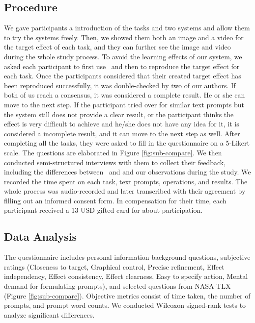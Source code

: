 \subsection{Procedure} 
We gave participants a  introduction of the tasks and two systems and allow them to try the systems freely. Then, we showed them both an image and a video for the target effect of {each task}, %
and they can further see the image and video during the whole study process. To avoid the learning effects of our system, we asked each participant to first use \sysName~and then  to reproduce the target effect for each task. Once the participants considered that their created target effect has been reproduced successfully, it was double-checked by two of our authors. If both 
of us reach %
a consensus, it was considered a complete result. He or she can move to the next step. If the participant tried over   
for %
similar text prompts {but} %
the system still does not provide a clear result, or the participant thinks the effect is very difficult to achieve and he/she does not have any idea for it, it is considered a incomplete result, and it can move to the next step as well. After completing all the tasks, they were asked to fill in the questionnaire on a 5-Likert scale. The questions are {elaborated} %
in Figure \ref{fig:sub-compare}. We then conducted semi-structured interviews with them to collect their feedback, including the differences between \sysName~and  and our observations during the study. We recorded the time spent on each task, text prompts, operations, and results. The whole process was audio-recorded and later transcribed with their agreement by filling out an informed consent form. In compensation for their time, each participant received a 13-USD gifted card for about  participation.



\subsection{Data Analysis} 
The {questionnaire} includes personal information background questions, subjective ratings (Closeness to target, Graphical control, Precise refinement, Effect independency, Effect consistency, Effect clearness, Easy to specify action, Mental demand for formulating prompts), and selected questions from NASA-TLX (Figure \ref{fig:sub-compare}). Objective metrics consist of time taken, the number of prompts, and prompt word counts. We conducted Wilcoxon signed-rank tests to analyze significant differences.

